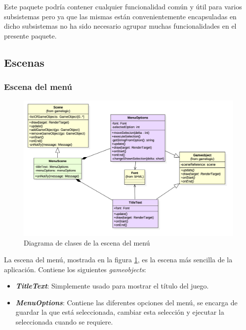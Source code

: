 \bigskip

Este paquete podría contener cualquier funcionalidad común y útil para varios subsistemas pero ya que las mismas están convenientemente encapsuladas en dicho subsistemas no ha sido necesario agrupar muchas funcionalidades en el presente paquete.

\subsection{Escenas}

\subsubsection*{Escena del menú}

\begin{figure}
	\centerline{\includegraphics[width=15cm]{otros/UML/png/alld/png/gamelogic__menu__diagramaDeClases_scene_menu_6.png}}
	\caption{Diagrama de clases de la escena del menú}
	\label{class:menu}
\end{figure}

La escena del menú, mostrada en la figura \ref{class:menu}, es la escena más sencilla de la aplicación. Contiene los siguientes \textit{gameobjects}:

\begin{itemize}
	\item \textbf{\textit{TitleText}}: Simplemente usado para mostrar el título del juego.
	\item \textbf{\textit{MenuOptions}}: Contiene las diferentes opciones del menú, se encarga de guardar la que está seleccionada, cambiar esta selección y ejecutar la seleccionada cuando se requiere.
\end{itemize}

